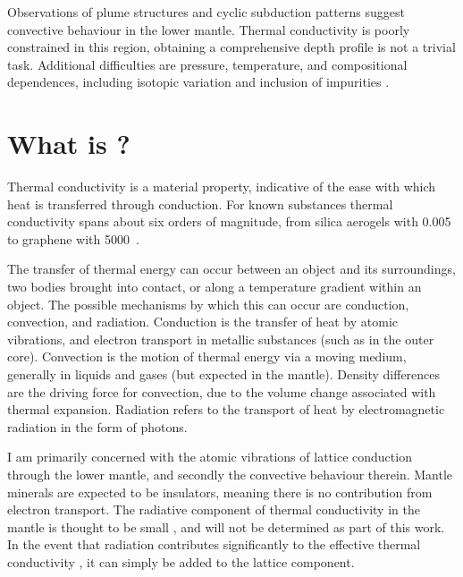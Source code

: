 Observations of plume structures and cyclic subduction patterns \citep[see][]{Garnero2008} suggest convective behaviour in the lower mantle. Thermal conductivity is poorly constrained in this region, obtaining a comprehensive depth profile is not a trivial task. Additional difficulties are pressure, temperature, and compositional dependences, including isotopic variation \citep{Tang2010,Dalton2013,Tang2014} and inclusion of impurities \citep{Manthilake2011,Ammann2014,Ohta2014}.
















\section{What is \tc?}
\label{sec:what_is_tc}

Thermal conductivity is a material property, indicative of the ease with which heat is transferred through conduction. For known substances thermal conductivity spans about six orders of magnitude, from silica aerogels with 0.005~\wmks \citep{Lee1995} to graphene with 5000~\wmks \citep{Balandin2008}.

The transfer of thermal energy can occur between an object and its surroundings, two bodies brought into contact, or along a temperature gradient within an object. The possible mechanisms by which this can occur are conduction, convection, and radiation. Conduction is the transfer of heat by atomic vibrations, and electron transport in metallic substances (such as in the outer core). Convection is the motion of thermal energy via a moving medium, generally in liquids and gases (but expected in the mantle). Density differences are the driving force for convection, due to the volume change associated with thermal expansion. Radiation refers to the transport of heat by electromagnetic radiation in the form of photons.

I am primarily concerned with the atomic vibrations of lattice conduction through the lower mantle, and secondly the convective behaviour therein. Mantle minerals are expected to be insulators, meaning there is no contribution from electron transport. The radiative component of thermal conductivity in the mantle is thought to be small \citep{Goncharov2008}, and will not be determined as part of this work. In the event that radiation contributes significantly to the effective thermal conductivity \citep{Keppler2008}, it can simply be added to the lattice component.

